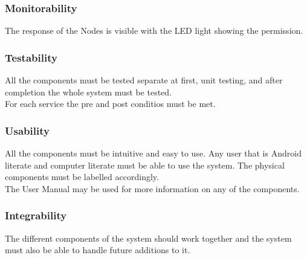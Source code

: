 \documentclass[a4paper,12pt,titlepage]{article}
\begin{document}
\subsubsection{Monitorability}
The response of the Nodes is visible with the LED light showing the permission.

\subsubsection{Testability}
All the components must be tested separate at first, unit testing, and after completion the whole system must be tested.
\\ For each service the pre and post conditios must be met.

\subsubsection{Usability}
All the components must be intuitive and easy to use. Any user that is Android literate and computer literate must be able to use the system. The physical components must be labelled accordingly. 
\\ The User Manual may be used for more information on any of the components. 

\subsubsection{Integrability}
The different components of the system should work together and the system must also be able to handle future additions to it.\\
\end{document}
